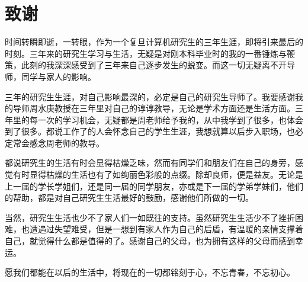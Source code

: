\chapter*{致谢}

时间转瞬即逝，一转眼，作为一个复旦计算机研究生的三年生涯，即将引来最后的时刻。三年来的研究生学习与生活，无疑是对刚本科毕业时的我的一番锤炼与鞭策，此刻的我深深感受到了三年来自己逐步发生的蜕变。而这一切无疑离不开导师，同学与家人的影响。

三年的研究生生涯，对自己影响最深的，必定是自己的研究生导师了。我要感谢我的导师周水庚教授在三年里对自己的谆谆教导，无论是学术方面还是生活方面。三年里的每一次的学习机会，无疑都是周老师给予我的，从中我学到了很多，也体会到了很多。都说工作了的人会怀念自己的学生生涯，我想就算以后步入职场，也必定常会感念周老师的教导。

都说研究生的生活有时会显得枯燥乏味，然而有同学们和朋友们在自己的身旁，感觉有时显得枯燥的生活也有了如绚丽色彩般的点缀。除却良师，便是益友。无论是上一届的学长学姐们，还是同一届的同学朋友，亦或是下一届的学弟学妹们，他们的帮助，都是对自己研究生生活最好的鼓励，感谢他们所做的一切。

当然，研究生生活也少不了家人们一如既往的支持。虽然研究生生活少不了挫折困难，也遭遇过失望难受，但是一想到有家人作为自己的后盾，有温暖的亲情支撑着自己，就觉得什么都是值得的了。感谢自己的父母，也为拥有这样的父母而感到幸运。

愿我们都能在以后的生活中，将现在的一切都铭刻于心，不忘青春，不忘初心。
